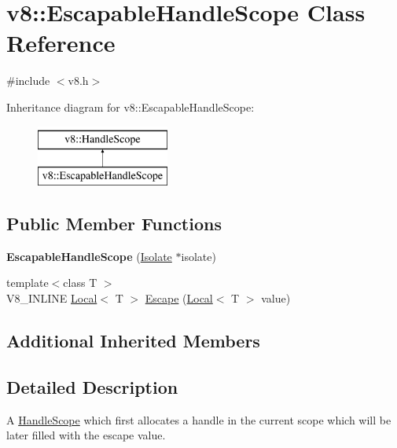 \hypertarget{classv8_1_1EscapableHandleScope}{}\section{v8\+:\+:Escapable\+Handle\+Scope Class Reference}
\label{classv8_1_1EscapableHandleScope}


{\ttfamily \#include $<$v8.\+h$>$}

Inheritance diagram for v8\+:\+:Escapable\+Handle\+Scope\+:\begin{figure}[H]
\begin{center}
\leavevmode
\includegraphics[height=2.000000cm]{classv8_1_1EscapableHandleScope}
\end{center}
\end{figure}
\subsection*{Public Member Functions}
\begin{DoxyCompactItemize}
\item 
{\bfseries Escapable\+Handle\+Scope} (\hyperlink{classv8_1_1Isolate}{Isolate} $\ast$isolate)\hypertarget{classv8_1_1EscapableHandleScope_aea39a7fd4dee6da31f3921ff891e1731}{}\label{classv8_1_1EscapableHandleScope_aea39a7fd4dee6da31f3921ff891e1731}

\item 
{\footnotesize template$<$class T $>$ }\\V8\+\_\+\+I\+N\+L\+I\+NE \hyperlink{classv8_1_1Local}{Local}$<$ T $>$ \hyperlink{classv8_1_1EscapableHandleScope_afdf0d3850978f65d1a827f78b3a2b6fd}{Escape} (\hyperlink{classv8_1_1Local}{Local}$<$ T $>$ value)
\end{DoxyCompactItemize}
\subsection*{Additional Inherited Members}


\subsection{Detailed Description}
A \hyperlink{classv8_1_1HandleScope}{Handle\+Scope} which first allocates a handle in the current scope which will be later filled with the escape value. 

